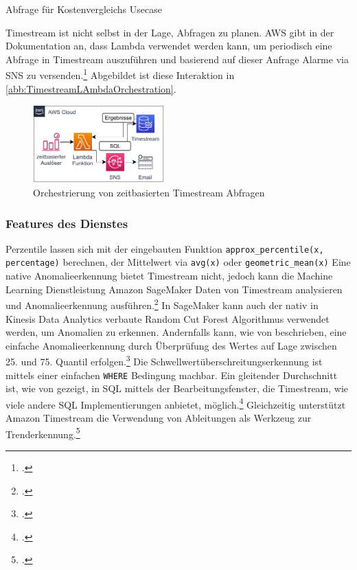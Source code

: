 \begin{listing}[H]
\inputminted[frame=lines,breaklines=true]{sql}{code/timestream-threshold.sql}
\caption{Abfrage für Kostenvergleichs Usecase}
\label{listing:timestream-kostenvergleich}
\end{listing}

Timestream ist nicht selbst in der Lage, Abfragen zu planen. \ac{AWS} gibt in der Dokumentation an, dass Lambda verwendet werden kann, um periodisch eine Abfrage in Timestream auszuführen und basierend auf dieser Anfrage Alarme via \ac{SNS} zu versenden.\footcite[Vgl.][]{AmazonWebServicesInc..o.J.ag} Abgebildet ist diese Interaktion in \autoref{abb:TimestreamLAmbdaOrchestration}.


\begin{figure}[H]
\centering
\includegraphics[width=0.45\textwidth]{graphics/Lambda-Timestream-Orchestration.pdf}
\caption{Orchestrierung von zeitbasierten Timestream Abfragen}
\label{abb:TimestreamLAmbdaOrchestration}
\end{figure}

\subsubsection{Features des Dienstes}
Perzentile lassen sich mit der eingebauten Funktion \texttt{approx_percentile(x, percentage)} berechnen, der Mittelwert via \texttt{avg(x)} oder \texttt{geometric_mean(x)}
Eine native Anomalieerkennung bietet Timestream nicht, jedoch kann die Machine Learning Dienstleistung Amazon SageMaker Daten von Timestream analysieren und Anomalieerkennung ausführen.\footcite[Vgl. auch im Folgenden][]{AmazonWebServicesInc..o.J.aj} In SageMaker kann auch der nativ in Kinesis Data Analytics verbaute Random Cut Forest Algorithmus verwendet werden, um Anomalien zu erkennen. Andernfalls kann, wie von \citeauthor{Salgado.2019} beschrieben, eine einfache Anomalieerkennung durch Überprüfung des Wertes auf Lage zwischen 25. und 75. Quantil erfolgen.\footcite[Vgl.][]{Salgado.2019}
Die Schwellwertüberschreitungserkennung ist mittels einer einfachen \texttt{WHERE} Bedingung machbar.
Ein gleitender Durchschnitt ist, wie von \citeauthor{Ross.2020} gezeigt, in SQL mittels der Bearbeitungsfenster, die Timestream, wie viele andere \ac{SQL} Implementierungen anbietet, möglich.\footcite[Vgl.][]{Ross.2020} Gleichzeitig unterstützt Amazon Timestream die Verwendung von Ableitungen als Werkzeug zur Trenderkennung.\footcite[Vgl.][]{AmazonWebServicesInc..o.J.ai}


